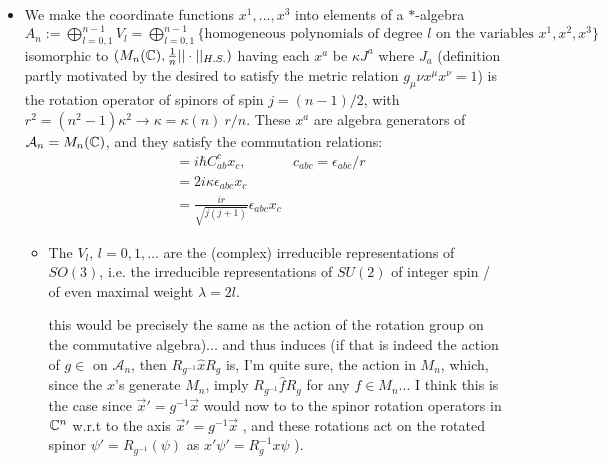 \documentclass{article}
\begin{document}
\begin{itemize}
\begin{itemize}
        \end{itemize}
    
    \item We make the coordinate functions $x^1, \dots, x^3$ into elements of a $*$-algebra $A_n := \bigoplus_{l = 0, 1}^{n-1} V_l = \bigoplus_{l = 0, 1}^{n-1} \{\text{homogeneous polynomials of degree } l \text{ on the variables } x^1, x^2, x^3\}$ isomorphic to $(M_n(\mathbb{C}), \frac{1}{n}||\cdot||_{H.S.} )$ having each $x^a$ be $
    \kappa J^a$ where $J_a$ (definition partly motivated by the desired to satisfy the metric relation $g_\mu \nu x^\mu x^\nu = 1$) is the rotation operator of spinors of spin $j = (n-1)/2$, with $r^2 = (n^2-1)\kappa^2 \rightarrow \kappa = \kappa(n) ~ r/n$. These $x^a$ are algebra generators of $\mathcal A_n = M_n(\mathbb{C})$, and they satisfy the commutation relations:
    \begin{align}
    [x_a, x_b] &= i \hbar C^c_{ab}x_c, &c_{abc} = \epsilon_{abc}/r   \\
               &= 2i \kappa \epsilon_{abc} x_c\\
               &= \frac{ir}{\sqrt{j(j+1)}} \epsilon_{abc}x_c
    \end{align}
    
    
    
        \begin{itemize}
        
        \item The $V_l$, $l = 0, 1, \dots$ are the (complex) irreducible representations of $SO(3)$, i.e. the irreducible representations of $SU(2)$ of integer spin / of even maximal weight $\lambda = 2l$.
        
         this would be precisely the same as the action of the rotation group on the commutative algebra)... and thus induces  (if that is indeed the action of $g \in $ on $\mathcal A_n$, then $R_{g^{-1}}\hat x R_g$ is, I'm quite sure, the action in $M_n$, which, since the $\hat x$'s generate $M_n$, imply $R_{g^{-1}}\hat f R_g$ for any $f \in M_n$... \tiny{I think this is the case since $\vec x' = g^{-1}\vec x$ would now to to the spinor rotation operators in $\mathbb{C}^n$ w.r.t to the axis $\vec x' = g^{-1} \vec x$ }, and these rotations act on the rotated spinor $\psi' = R_{g^{-1}}(\psi)$ as $x'\psi' = R_g^{-1}x\psi$ ).
        

\end{itemize}
\end{itemize}
\end{document}
